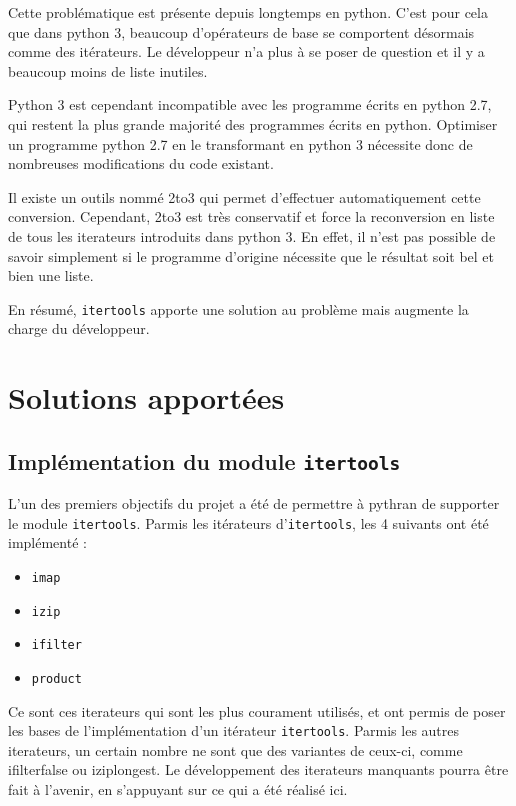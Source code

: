 \documentclass[a4paper]{article}
\begin{document}
Cette problématique est présente depuis longtemps en python. C'est
pour cela que dans python 3, beaucoup d'opérateurs de base se
comportent désormais comme des itérateurs. Le développeur n'a plus à
se poser de question et il y a beaucoup moins de liste inutiles.

Python 3 est cependant incompatible avec les programme écrits en
python 2.7, qui restent la plus grande majorité des programmes écrits
en python. Optimiser un programme python 2.7 en le transformant en
python 3 nécessite donc de nombreuses modifications du code existant.

Il existe un outils nommé 2to3 qui permet d'effectuer automatiquement
cette conversion. Cependant, 2to3 est très conservatif et force la
reconversion en liste de tous les iterateurs introduits dans python
3. En effet, il n'est pas possible de savoir simplement si le
programme d'origine nécessite que le résultat soit bel et bien une
liste.

En résumé, \texttt{itertools} apporte une solution au problème mais augmente la
charge du développeur.

\section*{Solutions apportées}

\subsection*{Implémentation du module \texttt{itertools}}

L'un des premiers objectifs du projet a été de permettre à pythran de
supporter le module \texttt{itertools}. Parmis les itérateurs d'\texttt{itertools}, les
4 suivants ont été implémenté :

\begin{itemize}
  \item \texttt{imap}
  \item \texttt{izip}
  \item \texttt{ifilter}
  \item \texttt{product}
\end{itemize}

Ce sont ces iterateurs qui sont les plus courament utilisés, et ont
permis de poser les bases de l'implémentation d'un itérateur
\texttt{itertools}. Parmis les autres iterateurs, un certain nombre ne sont que
des variantes de ceux-ci, comme ifilterfalse ou iziplongest. Le
développement des iterateurs manquants pourra être fait à l'avenir, en
s'appuyant sur ce qui a été réalisé ici.
\end{document}
